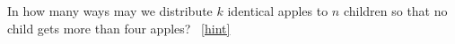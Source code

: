 \documentclass{book}
\begin{document}
\setcounter{project}{225}
\addtocounter{project}{-1}
\begin{activity}[]\label{act_restrictedmultisetspie}
\hypertarget{p-1246}{}%
In how many ways may we distribute \(k\) identical apples to \(n\) children so that no child gets more than four apples?%
~\hfill{\tiny\hyperlink{a-225}{[hint]}\hypertarget{q-225}{}}\end{activity}
\end{document}
